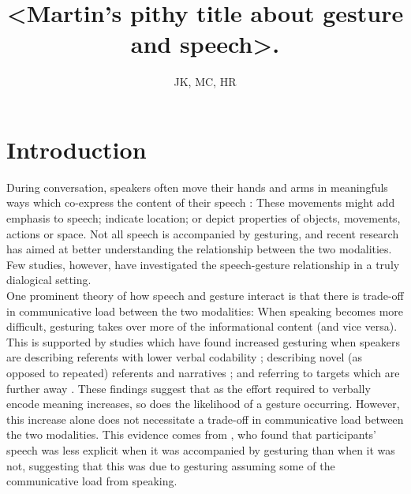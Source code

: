 \documentclass[a4paper,man,natbib]{apa6}
\title{<Martin's pithy title about gesture and speech>.}
\author{JK, MC, HR}
\affiliation{Psychology, PPLS, University of Edinburgh}
\begin{document}
\maketitle


\section{Introduction}
\noindent
During conversation, speakers often move their hands and arms in meaningfuls ways which co-express the content of their speech \citep{McNeill1992}:
These movements might add emphasis to speech; indicate location; or depict properties of objects, movements, actions or space.
Not all speech is accompanied by gesturing, and recent research has aimed at better understanding the relationship between the two modalities.
Few studies, however, have investigated the speech-gesture relationship in a truly dialogical setting.\\

One prominent theory of how speech and gesture interact \citep{Bangerter2004, DeRuiter2006} is that there is trade-off in communicative load between the two modalities:
When speaking becomes more difficult, gesturing takes over more of the informational content (and vice versa).
This is supported by studies which have found increased gesturing when speakers are describing referents with lower verbal codability \citep{Morsella2004}; describing novel (as opposed to repeated) referents and narratives \citep{Hoetjes2015, Jacobs2007}; and referring to targets which are further away \citep{Bangerter2004}.
These findings suggest that as the effort required to verbally encode meaning increases, so does the likelihood of a gesture occurring.
However, this increase alone does not necessitate a trade-off in communicative load between the two modalities.
This evidence comes from \citet{Melinger2004}, who found that participants' speech was less explicit when it was accompanied by gesturing than when it was not, suggesting that this was due to gesturing assuming some of the communicative load from speaking.\\
\end{document}
